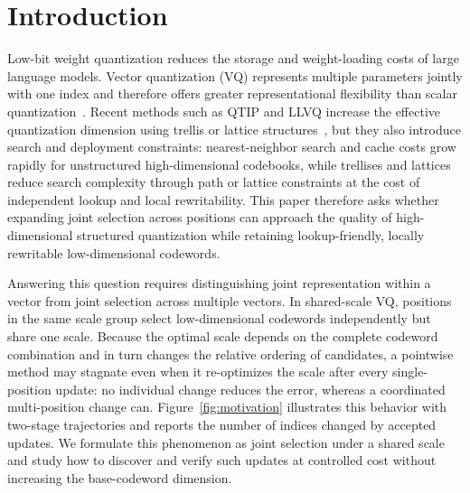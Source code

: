\section{Introduction}

Low-bit weight quantization reduces the storage and weight-loading costs of large language models. Vector quantization (VQ) represents multiple parameters jointly with one index and therefore offers greater representational flexibility than scalar quantization~\cite{grayneuhoff,gershogray}. Recent methods such as QTIP and LLVQ increase the effective quantization dimension using trellis or lattice structures~\cite{qtip,llvq}, but they also introduce search and deployment constraints: nearest-neighbor search and cache costs grow rapidly for unstructured high-dimensional codebooks, while trellises and lattices reduce search complexity through path or lattice constraints at the cost of independent lookup and local rewritability. This paper therefore asks whether expanding joint selection across positions can approach the quality of high-dimensional structured quantization while retaining lookup-friendly, locally rewritable low-dimensional codewords.

Answering this question requires distinguishing joint representation within a vector from joint selection across multiple vectors. In shared-scale VQ, positions in the same scale group select low-dimensional codewords independently but share one scale. Because the optimal scale depends on the complete codeword combination and in turn changes the relative ordering of candidates, a pointwise method may stagnate even when it re-optimizes the scale after every single-position update: no individual change reduces the error, whereas a coordinated multi-position change can. Figure~\ref{fig:motivation} illustrates this behavior with two-stage trajectories and reports the number of indices changed by accepted updates. We formulate this phenomenon as joint selection under a shared scale and study how to discover and verify such updates at controlled cost without increasing the base-codeword dimension.

